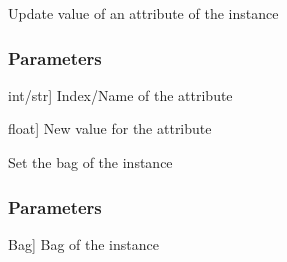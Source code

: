 \documentclass[letterpaper,10pt,english]{sphinxmanual}
\begin{document}
\begin{fulllineitems}
\begin{fulllineitems}
\begin{description}
\end{description}

\end{fulllineitems}


\begin{fulllineitems}
\label{\detokenize{data/_autosummary/miml.data.instance.Instance:miml.data.instance.Instance.set_attribute}}
\pysigstartsignatures
{}
\pysigstopsignatures
\sphinxAtStartPar
Update value of an attribute of the instance


\subsubsection{Parameters}
\label{\detokenize{data/_autosummary/miml.data.instance.Instance:id12}}\begin{description}
\sphinxlineitem{attribute}{[}int/str{]}
\sphinxAtStartPar
Index/Name of the attribute

\sphinxlineitem{value}{[}float{]}
\sphinxAtStartPar
New value for the attribute

\end{description}

\end{fulllineitems}


\begin{fulllineitems}
\label{\detokenize{data/_autosummary/miml.data.instance.Instance:miml.data.instance.Instance.set_bag}}
\pysigstartsignatures
{}
\pysigstopsignatures
\sphinxAtStartPar
Set the bag of the instance


\subsubsection{Parameters}
\label{\detokenize{data/_autosummary/miml.data.instance.Instance:id13}}\begin{description}
\sphinxlineitem{bag}{[}Bag{]}
\sphinxAtStartPar
Bag of the instance


\end{description}
\end{fulllineitems}
\end{fulllineitems}
\end{document}
